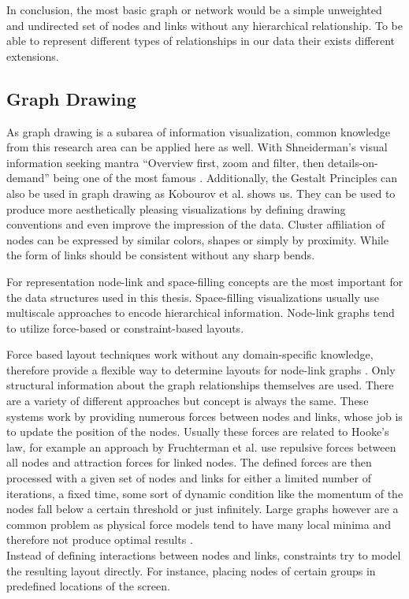 In conclusion, the most basic graph or network would be a simple unweighted and undirected set of nodes and links without any hierarchical relationship. To be able to represent different types of relationships in our data their exists different extensions. 

\subsection{Graph Drawing}

As graph drawing is a subarea of information visualization, common knowledge from this research area can be applied here as well. With Shneiderman's visual information seeking mantra “Overview first, zoom and filter, then details-on-demand” being one of the most famous \cite{shneiderman_eyes_1996}. Additionally, the Gestalt Principles can also be used in graph drawing as Kobourov et al.
\cite{kobourov_gestalt_2015} shows us. They can be used to produce more aesthetically pleasing visualizations by defining drawing conventions and even improve the impression of the data. Cluster affiliation of nodes can be expressed by similar colors, shapes or simply by proximity. While the form of links should be consistent without any sharp bends.

For representation node-link and space-filling concepts are the most important for the data structures used in this thesis. Space-filling visualizations usually use multiscale approaches to encode hierarchical information. Node-link graphs tend to utilize force-based or constraint-based layouts\cite{von_landesberger_visual_2011}.

Force based layout techniques work without any domain-specific knowledge, therefore provide a flexible way to determine layouts for node-link graphs \cite{kobourov_spring_2012}. Only structural information about the graph relationships themselves are used. 
There are a variety of different approaches but concept is always the same. 
These systems work by providing numerous forces between nodes and links, whose job is to update the position of the nodes. Usually these forces are related to Hooke's law, for example an approach by Fruchterman et al. \cite{fruchterman_graph_1991} use repulsive forces between all nodes and attraction forces for linked nodes.
The defined forces are then processed with a given set of nodes and links for either a limited number of iterations, a fixed time, some sort of dynamic condition like the momentum of the nodes fall below a certain threshold or just infinitely.
Large graphs however are a common problem as physical force models tend to have many local minima and therefore not produce optimal results \cite{kobourov_spring_2012}.\\
Instead of defining interactions between nodes and links, constraints try to model the resulting layout directly. For instance, placing nodes of certain groups in predefined locations of the screen.   

